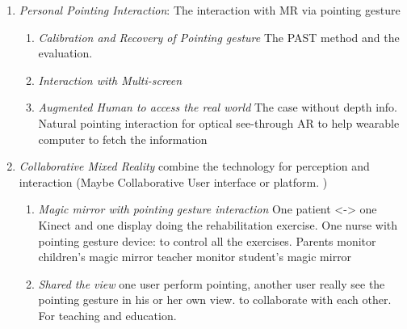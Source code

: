 \begin{enumerate}
	\item
		\emph{Personal Pointing Interaction}: The interaction with MR via pointing gesture
		\begin{enumerate}
			\item \emph{Calibration and Recovery of Pointing gesture} The PAST method and the evaluation. 
			\item \emph{Interaction with Multi-screen} 
			\item \emph{Augmented Human to access the real world} The case without depth info. Natural pointing interaction for optical see-through AR to help wearable computer to fetch the information%
		\end{enumerate}
	\item \emph{Collaborative Mixed Reality} combine the technology for perception and interaction (Maybe Collaborative User interface or platform. )
		\begin{enumerate}
			\item \emph{Magic mirror with pointing gesture interaction} One patient <-> one Kinect and one display  doing the rehabilitation exercise.
			One nurse with pointing gesture device: to control all the exercises. 
			Parents monitor children’s magic mirror  teacher monitor student’s magic mirror 
			\item \emph{Shared the view} one user perform pointing, another user really see the pointing gesture in his or her own view. to collaborate with each other. For teaching and education. 
		\end{enumerate}
\end{enumerate}




